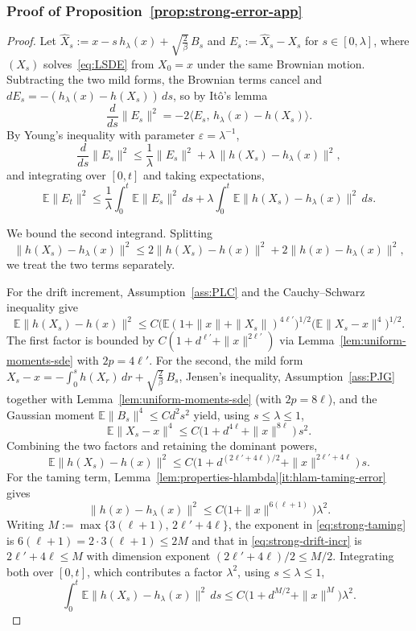 \documentclass[11pt,a4paper,reqno]{amsart}
\theoremstyle{plain}
\theoremstyle{definition}
\theoremstyle{remark}
\newcommand{\E}{\mathbb{E}}
\begin{document}
\subsubsection{Proof of Proposition~\ref{prop:strong-error-app}}
\label{proof:strong-error}
\begin{proof}
Let $\widehat X_s:=x-s\,h_\lambda(x)+\sqrt{\frac{2}{\beta}}\,B_s$ and
$E_s:=\widehat X_s-X_s$ for $s\in[0,\lambda]$, where $(X_s)$ solves~\eqref{eq:LSDE}
from $X_0=x$ under the same Brownian motion. Subtracting the two mild forms, the
Brownian terms cancel and $dE_s=-(h_\lambda(x)-h(X_s))\,ds$, so
by It\^o's lemma
\[
  \frac{d}{ds}\|E_s\|^2
  =-2\bigl\langle E_s,\,h_\lambda(x)-h(X_s)\bigr\rangle.
\]
By Young's inequality with parameter $\varepsilon=\lambda^{-1}$,
\[
  \frac{d}{ds}\|E_s\|^2
  \le
  \frac{1}{\lambda}\|E_s\|^2
  +\lambda\,\|h(X_s)-h_\lambda(x)\|^2,
\]
and integrating over $[0,t]$ and taking expectations,
\begin{equation}\label{eq:strong-young-eps}
  \E\|E_t\|^2
  \le
  \frac{1}{\lambda}\int_0^t \E\|E_s\|^2\,ds
  +
  \lambda\int_0^t \E\|h(X_s)-h_\lambda(x)\|^2\,ds.
\end{equation}

We bound the second integrand. Splitting
\[
  \|h(X_s)-h_\lambda(x)\|^2
  \le
  2\|h(X_s)-h(x)\|^2+2\|h(x)-h_\lambda(x)\|^2,
\]
we treat the two terms separately.

For the drift increment, Assumption~\ref{ass:PLC} and the Cauchy--Schwarz
inequality give
\[
  \E\|h(X_s)-h(x)\|^2
  \le
  C\bigl(\E(1+\|x\|+\|X_s\|)^{4\ell'}\bigr)^{1/2}
   \bigl(\E\|X_s-x\|^{4}\bigr)^{1/2}.
\]
The first factor is bounded by $C(1+d^{\ell'}+\|x\|^{2\ell'})$ via
Lemma~\ref{lem:uniform-moments-sde} with $2p=4\ell'$. For the second, the mild
form $X_s-x=-\int_0^s h(X_r)\,dr+\sqrt{\frac{2}{\beta}}\,B_s$, Jensen's inequality,
Assumption~\ref{ass:PJG} together with Lemma~\ref{lem:uniform-moments-sde}
(with $2p=8\ell$), and the Gaussian moment $\E\|B_s\|^4\le Cd^2s^2$ yield, using
$s\le\lambda\le1$,
\[
  \E\|X_s-x\|^4
  \le
  C\bigl(1+d^{4\ell}+\|x\|^{8\ell}\bigr)\,s^2.
\]
Combining the two factors and retaining the dominant powers,
\begin{equation}\label{eq:strong-drift-incr}
  \E\|h(X_s)-h(x)\|^2
  \le
  C\bigl(1+d^{(2\ell'+4\ell)/2}+\|x\|^{2\ell'+4\ell}\bigr)\,s.
\end{equation}
For the taming term, Lemma~\ref{lem:properties-hlambda}\ref{it:hlam-taming-error}
gives
\begin{equation}\label{eq:strong-taming}
  \|h(x)-h_\lambda(x)\|^2
  \le
  C\bigl(1+\|x\|^{6(\ell+1)}\bigr)\lambda^2.
\end{equation}
Writing $M:=\max\{3(\ell+1),\,2\ell'+4\ell\}$, the exponent in
\eqref{eq:strong-taming} is $6(\ell+1)=2\cdot3(\ell+1)\le 2M$ and that in
\eqref{eq:strong-drift-incr} is $2\ell'+4\ell\le M$ with dimension exponent
$(2\ell'+4\ell)/2\le M/2$. Integrating both over $[0,t]$, which contributes a
factor $\lambda^2$, using $s\le\lambda\le1$,
\begin{equation}\label{eq:strong-drift-int-final}
  \int_0^t \E\|h(X_s)-h_\lambda(x)\|^2\,ds
  \le
  C\bigl(1+d^{M/2}+\|x\|^{M}\bigr)\lambda^2.
\end{equation}


\end{proof}
\end{document}
